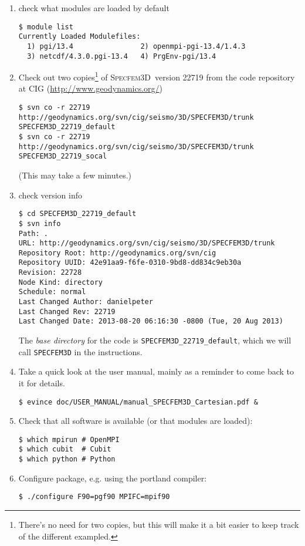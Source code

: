 \documentclass[10pt,fleqn,letterpaper]{article}
\newcommand{\specfem}{\textsc{Specfem3D}}
\begin{document}
\begin{enumerate}
\item check what modules are loaded by default
\begin{lstlisting}
$ module list
Currently Loaded Modulefiles:
  1) pgi/13.4                2) openmpi-pgi-13.4/1.4.3
  3) netcdf/4.3.0.pgi-13.4   4) PrgEnv-pgi/13.4
\end{lstlisting}

\item Check out two copies\footnote{There's no need for two copies, but this will make it a bit easier to keep track of the different exampled.} of \specfem\ version 22719 from the code repository at CIG (\url{http://www.geodynamics.org/})
%
\begin{lstlisting}
$ svn co -r 22719 http://geodynamics.org/svn/cig/seismo/3D/SPECFEM3D/trunk SPECFEM3D_22719_default
$ svn co -r 22719 http://geodynamics.org/svn/cig/seismo/3D/SPECFEM3D/trunk SPECFEM3D_22719_socal
\end{lstlisting}
%
(This may take a few minutes.)

\item check version info
%
\begin{lstlisting}
$ cd SPECFEM3D_22719_default
$ svn info
Path: .
URL: http://geodynamics.org/svn/cig/seismo/3D/SPECFEM3D/trunk
Repository Root: http://geodynamics.org/svn/cig
Repository UUID: 42e91aa9-f6fe-0310-9bd8-dd834c9eb30a
Revision: 22728
Node Kind: directory
Schedule: normal
Last Changed Author: danielpeter
Last Changed Rev: 22719
Last Changed Date: 2013-08-20 06:16:30 -0800 (Tue, 20 Aug 2013)
\end{lstlisting}

The {\em base directory} for the code is \verb+SPECFEM3D_22719_default+, which we will call \verb+SPECFEM3D+ in the instructions.

\item Take a quick look at the user manual, mainly as a reminder to come back to it for details.
%
\begin{lstlisting}
$ evince doc/USER_MANUAL/manual_SPECFEM3D_Cartesian.pdf &
\end{lstlisting}

\item Check that all software is available (or that modules are loaded):
\begin{lstlisting}
$ which mpirun # OpenMPI
$ which cubit  # Cubit
$ which python # Python
\end{lstlisting}

\item Configure package, e.g. using the portland compiler:
\begin{lstlisting}
$ ./configure F90=pgf90 MPIFC=mpif90
\end{lstlisting}


\end{enumerate}
\end{document}
